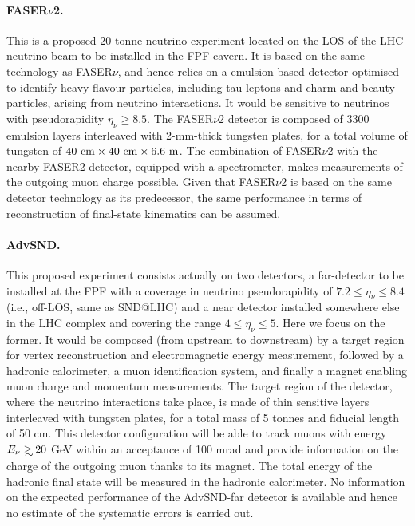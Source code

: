 \paragraph{FASER$\nu$2.}
%
This is a proposed 20-tonne neutrino experiment located on the LOS
of the LHC neutrino beam to be installed in the FPF cavern.
%
It is based on the same technology as FASER$\nu$, and hence
relies on a emulsion-based detector optimised to identify heavy flavour particles, including
tau leptons and charm and beauty particles, arising from neutrino interactions.
%
It would be sensitive to neutrinos with pseudorapidity $\eta_\nu \ge 8.5$.
%
The FASER$\nu$2 detector is composed of 3300 emulsion layers interleaved with 2-mm-thick tungsten plates,
for a total volume of  tungsten of $40~\rm{cm} \times 40~\rm{cm} \times 6.6~{\rm m}$.
%
The combination of FASER$\nu$2  with the nearby FASER2 detector, equipped with a spectrometer, makes measurements of the outgoing muon charge possible.
%
Given that FASER$\nu$2 is based on the same detector technology
as its predecessor, the same performance in terms of reconstruction
of final-state kinematics can be assumed.

 \paragraph{AdvSND.}
 This proposed experiment consists actually on  two detectors, a far-detector to be installed
 at the FPF with a coverage in neutrino pseudorapidity of $7.2 \le \eta_\nu \le 8.4$
 (i.e., off-LOS, same as SND@LHC) and a near detector installed somewhere else in the LHC
 complex and covering the range $4 \le \eta_\nu \le 5$.
Here we focus on the former.
 It would be
 composed (from upstream to downstream) by a target region
 for  vertex reconstruction and electromagnetic energy measurement, followed  by a hadronic calorimeter, a  muon 
 identification system, and finally  a magnet enabling muon charge and momentum measurements.
 The target region of the detector, where the neutrino interactions take place, is made of thin sensitive layers 
 interleaved with tungsten plates, for a total mass of 5 tonnes and fiducial length of 50 cm.
 This detector configuration will be able to track muons with energy $E_\nu \gsim 20$ GeV
 within an acceptance of 100 mrad and provide information on the charge
 of the  outgoing muon thanks to its magnet.
 The total energy of the hadronic final state will be measured
 in the hadronic calorimeter.
 No information on the expected performance of the AdvSND-far detector
 is available and hence no estimate of the systematic errors
 is carried out.

